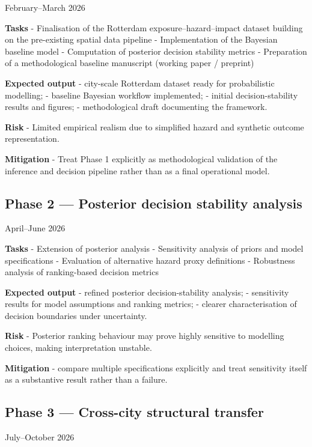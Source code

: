 \documentclass[
]{article}
\begin{document}
February--March 2026

\textbf{Tasks} - Finalisation of the Rotterdam exposure--hazard--impact
dataset building on the pre-existing spatial data pipeline -
Implementation of the Bayesian baseline model - Computation of posterior
decision stability metrics - Preparation of a methodological baseline
manuscript (working paper / preprint)

\textbf{Expected output} - city-scale Rotterdam dataset ready for
probabilistic modelling; - baseline Bayesian workflow implemented; -
initial decision-stability results and figures; - methodological draft
documenting the framework.

\textbf{Risk} - Limited empirical realism due to simplified hazard and
synthetic outcome representation.

\textbf{Mitigation} - Treat Phase 1 explicitly as methodological
validation of the inference and decision pipeline rather than as a final
operational model.

\subsection{Phase 2 --- Posterior decision stability
analysis}\label{phase-2-posterior-decision-stability-analysis}

April--June 2026

\textbf{Tasks} - Extension of posterior analysis - Sensitivity analysis
of priors and model specifications - Evaluation of alternative hazard
proxy definitions - Robustness analysis of ranking-based decision
metrics

\textbf{Expected output} - refined posterior decision-stability
analysis; - sensitivity results for model assumptions and ranking
metrics; - clearer characterisation of decision boundaries under
uncertainty.

\textbf{Risk} - Posterior ranking behaviour may prove highly sensitive
to modelling choices, making interpretation unstable.

\textbf{Mitigation} - compare multiple specifications explicitly and
treat sensitivity itself as a substantive result rather than a failure.

\subsection{Phase 3 --- Cross-city structural
transfer}\label{phase-3-cross-city-structural-transfer}

July--October 2026
\end{document}
